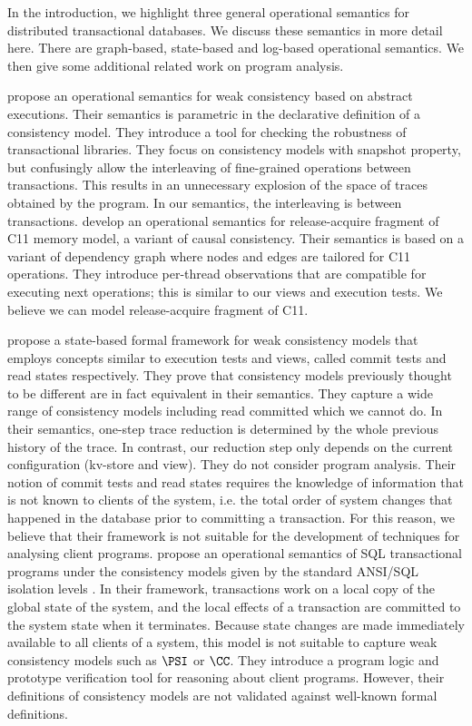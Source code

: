 In the introduction, we highlight three general operational semantics for 
distributed transactional databases.
We discuss these semantics in more detail here.
There are graph-based, state-based and log-based operational semantics.
We then give some additional related work on program analysis. 

\citet{sureshConcur} propose an operational semantics for weak consistency based on abstract executions. 
Their semantics is parametric in the declarative definition of a consistency model. 
They introduce a tool for checking the robustness of transactional  libraries.
They focus on consistency models with snapshot property, but confusingly allow 
the interleaving of fine-grained operations between transactions. 
This results in an unnecessary explosion of the space of traces obtained by 
the program. In our semantics, the interleaving is between transactions.
\citet{op-semantics-c11-rar} develop an operational semantics for release-acquire fragment of
C11 memory model, a variant of causal consistency.
Their semantics is based on a variant of dependency graph where nodes and edges 
are tailored for C11 operations.
They introduce per-thread observations that are compatible for executing next operations;
this is similar to our views and execution tests.
We believe we can model release-acquire fragment of C11.

\citet{seebelieve} propose a state-based formal framework for weak consistency models 
that employs concepts  similar to execution tests and views, called commit tests and read states respectively.
They prove that consistency models previously thought to be different are in fact equivalent in their semantics. 
They capture a wide range of consistency models including read committed which we cannot do. 
In their semantics, one-step trace reduction is determined by the whole previous history of the trace. 
In contrast, our reduction step only depends on the current configuration (kv-store and view).
They do not consider program analysis. Their notion of commit tests and read states requires 
the knowledge of information that is not known to clients of the system, i.e. the total order of system changes that happened in the database 
prior to committing a transaction. For this reason, we believe that
their framework is not suitable for the development of techniques for analysing client programs. 
\citet{alonetogether} propose an operational semantics of SQL transactional programs 
under the consistency models given by the standard ANSI/SQL isolation levels \cite{si}.
In their  framework, transactions work on a local copy of the global state 
of the system, and the local effects of a transaction are committed to the  
system state when it terminates. Because state changes 
are made immediately available to all clients of a system, this model 
is not suitable to capture weak consistency models such as \(\PSI\) or \(\CC\). 
They introduce a program logic and prototype verification tool for reasoning 
about client programs. However, their definitions of consistency models 
are not validated against well-known formal definitions.

